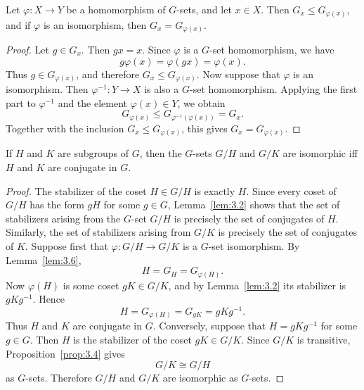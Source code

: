 \documentclass[../Odyssey_Project.tex]{subfiles}
\begin{document}
\begin{lemma}
\label{lem:3.6}
Let $\varphi : X \to Y$ be a homomorphism of $G$-sets, and let $x \in X$. Then $G_x \leq G_{\varphi(x)}$, and if $\varphi$ is an isomorphism, then $G_x = G_{\varphi(x)}$.
\end{lemma}

\begin{proof}
    Let $g \in G_x$. Then $gx = x$. Since $\varphi$ is a $G$-set homomorphism, we have
    \[
        g\varphi(x) = \varphi(gx) = \varphi(x).
    \]
    Thus $g \in G_{\varphi(x)}$, and therefore $G_x \leq G_{\varphi(x)}$.
    Now suppose that $\varphi$ is an isomorphism. Then $\varphi^{-1} \colon Y \to X$ is also a $G$-set homomorphism. Applying the first part to $\varphi^{-1}$ and the element $\varphi(x) \in Y$, we obtain
    \[
        G_{\varphi(x)} \leq G_{\varphi^{-1}(\varphi(x))} = G_x.
    \]
    Together with the inclusion $G_x \leq G_{\varphi(x)}$, this gives $G_x = G_{\varphi(x)}$.
\end{proof}

\begin{proposition}
\label{prop:3.7}
If $H$ and $K$ are subgroups of $G$, then the $G$-sets $G/H$ and $G/K$ are isomorphic iff $H$ and $K$ are conjugate in $G$.
\end{proposition}

\begin{proof}
    The stabilizer of the coset $H \in G/H$ is exactly $H$. Since every coset of $G/H$ has the form $gH$ for some $g \in G$, Lemma~\ref{lem:3.2} shows that the set of stabilizers arising from the $G$-set $G/H$ is precisely the set of conjugates of $H$. Similarly, the set of stabilizers arising from $G/K$ is precisely the set of conjugates of $K$.
    Suppose first that $\varphi \colon G/H \to G/K$ is a $G$-set isomorphism. By Lemma~\ref{lem:3.6},
    \[
        H = G_H = G_{\varphi(H)}.
    \]
    Now $\varphi(H)$ is some coset $gK \in G/K$, and by Lemma~\ref{lem:3.2} its stabilizer is $gKg^{-1}$. Hence
    \[
        H = G_{\varphi(H)} = G_{gK} = gKg^{-1}.
    \]
    Thus $H$ and $K$ are conjugate in $G$.
    Conversely, suppose that $H = gKg^{-1}$ for some $g \in G$. Then $H$ is the stabilizer of the coset $gK \in G/K$. Since $G/K$ is transitive, Proposition~\ref{prop:3.4} gives
    \[
        G/K \cong G/H
    \]
    as $G$-sets. Therefore $G/H$ and $G/K$ are isomorphic as $G$-sets.
\end{proof}
\end{document}
